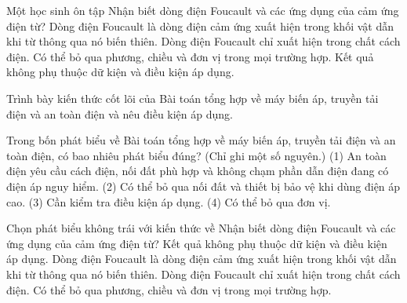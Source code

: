 \begin{ex}
Một học sinh ôn tập Nhận biết dòng điện Foucault và các ứng dụng của cảm ứng điện từ?
\choice
{\True Dòng điện Foucault là dòng điện cảm ứng xuất hiện trong khối vật dẫn khi từ thông qua nó biến thiên.}
{Dòng điện Foucault chỉ xuất hiện trong chất cách điện.}
{Có thể bỏ qua phương, chiều và đơn vị trong mọi trường hợp.}
{Kết quả không phụ thuộc dữ kiện và điều kiện áp dụng.}
\end{ex}

\begin{bt}
Trình bày kiến thức cốt lõi của Bài toán tổng hợp về máy biến áp, truyền tải điện và an toàn điện và nêu điều kiện áp dụng.
\end{bt}

\begin{ex}
Trong bốn phát biểu về Bài toán tổng hợp về máy biến áp, truyền tải điện và an toàn điện, có bao nhiêu phát biểu đúng? (Chỉ ghi một số nguyên.) (1) An toàn điện yêu cầu cách điện, nối đất phù hợp và không chạm phần dẫn điện đang có điện áp nguy hiểm. (2) Có thể bỏ qua nối đất và thiết bị bảo vệ khi dùng điện áp cao. (3) Cần kiểm tra điều kiện áp dụng. (4) Có thể bỏ qua đơn vị.
\end{ex}

\begin{ex}
Chọn phát biểu không trái với kiến thức về Nhận biết dòng điện Foucault và các ứng dụng của cảm ứng điện từ?
\choice
{Kết quả không phụ thuộc dữ kiện và điều kiện áp dụng.}
{\True Dòng điện Foucault là dòng điện cảm ứng xuất hiện trong khối vật dẫn khi từ thông qua nó biến thiên.}
{Dòng điện Foucault chỉ xuất hiện trong chất cách điện.}
{Có thể bỏ qua phương, chiều và đơn vị trong mọi trường hợp.}
\end{ex}

